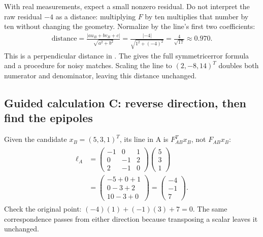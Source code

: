 \documentclass[letterpaper,11pt,english,openany,oneside]{jupyterBook}
\begin{document}
\sphinxAtStartPar
With real measurements, expect a small nonzero residual. Do not interpret the raw residual \(-4\) as a distance: multiplying \(F\) by ten multiplies that number by ten without changing the geometry. Normalize by the line’s first two coefficients:
\begin{equation*}
\begin{split}\text{distance}=\frac{|au_B+bv_B+c|}{\sqrt{a^2+b^2}}
=\frac{|-4|}{\sqrt{1^2+(-4)^2}}
=\frac4{\sqrt{17}}\approx0.970.\end{split}
\end{equation*}
\sphinxAtStartPar
This is a perpendicular distance in . The {\hyperref[\detokenize{lectures/lecture04/estimation::doc}]{}} gives the full symmetric\sphinxhyphen{}error formula and a procedure for noisy matches. Scaling the line to \((2,-8,14)^T\) doubles both numerator and denominator, leaving this distance unchanged.


\subsection{Guided calculation C: reverse direction, then find the epipoles}
\label{\detokenize{lectures/lecture04/epipolar-practice:guided-calculation-c-reverse-direction-then-find-the-epipoles}}\label{\detokenize{lectures/lecture04/epipolar-practice:epipolar-reverse}}
\sphinxAtStartPar
{} Given the candidate \(x_B=(5,3,1)^T\), its line in A is \(F_{AB}^Tx_B\), not \(F_{AB}x_B\):
\begin{equation*}
\begin{split}
\begin{aligned}
\ell_A&=\begin{pmatrix}-1&0&1\\0&-1&2\\2&-1&0\end{pmatrix}
\begin{pmatrix}5\\3\\1\end{pmatrix}\\
&=\begin{pmatrix}-5+0+1\\0-3+2\\10-3+0\end{pmatrix}
=\begin{pmatrix}-4\\-1\\7\end{pmatrix}.
\end{aligned}
\end{split}
\end{equation*}
\sphinxAtStartPar
Check the original point: \((-4)(1)+(-1)(3)+7=0\). The same correspondence passes from either direction because transposing a scalar leaves it unchanged.
\end{document}
